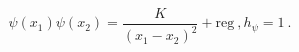 \begin{equation}
\psi(x_1)\psi(x_2)=\frac{K}{(x_1-x_2)^2}+
\mathrm{reg} \ , h_{\psi}=1 \ .
\end{equation}

